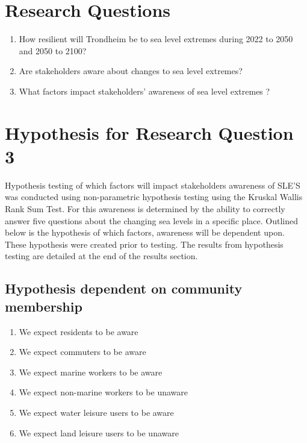 \section{Research Questions}
\begin{enumerate}
    \item How resilient will Trondheim be to sea level extremes during 2022 to 2050 and 2050 to 2100?
    \item Are stakeholders aware about changes to sea level extremes?
    \item What factors impact stakeholders’ awareness of sea level extremes ?
\end{enumerate}



\section{Hypothesis for Research Question 3}
Hypothesis testing  of which factors will impact stakeholders awareness of SLE'S was conducted using non-parametric hypothesis testing using the Kruskal Wallis Rank Sum Test. For this awareness is determined by the ability to correctly answer five questions about the changing sea levels in a specific place. Outlined below is the hypothesis of which factors, awareness will be dependent upon. These hypothesis were created prior to testing. The results from hypothesis testing are detailed at the end of the results section. 

\subsection{Hypothesis dependent on community membership}
\begin{enumerate}
    \item We expect residents to be aware
    \item We expect commuters to be aware
    \item We expect marine workers to be aware
    \item We expect non-marine workers to be unaware
    \item We expect water leisure users to be aware
    \item We expect land leisure users to be unaware
    \end{enumerate}
\paragraph{}

